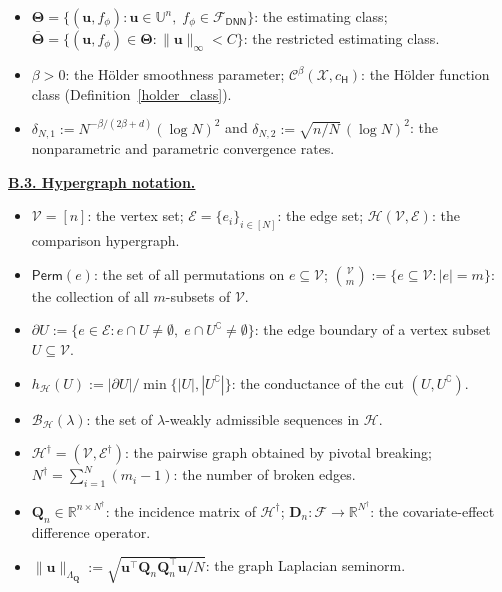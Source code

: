 \documentclass[
  12pt]{article}
\begin{document}
\begin{itemize}
    \item $\boldsymbol{\Theta} = \{(\boldsymbol{u}, f_\phi) : \boldsymbol{u} \in \mathbb{U}^n,\; f_\phi \in \mathcal{F}_{\mathsf{DNN}}\}$: the estimating class; $\bar{\boldsymbol{\Theta}} = \{(\boldsymbol{u}, f_\phi) \in \boldsymbol{\Theta} : \|\boldsymbol{u}\|_\infty < C\}$: the restricted estimating class.
    \item $\beta > 0$: the H\"older smoothness parameter; {$\mathcal{C}^\beta(\mathcal{X}, c_{\mathsf{H}})$}: the H\"older function class (Definition~\ref{holder_class}).
    \item $\delta_{N,1} := N^{-\beta/(2\beta+d)}(\log N)^2$ and $\delta_{N,2} := \sqrt{n/N}\,(\log N)^2$: the nonparametric and parametric convergence rates.
\end{itemize}
\underline{\textbf{B.3. Hypergraph notation.}}
\begin{itemize}
    \item $\mathcal{V} = [n]$: the vertex set; $\mathcal{E} = \{e_i\}_{i \in [N]}$: the edge set; $\mathcal{H}(\mathcal{V}, \mathcal{E})$: the comparison hypergraph.
    \item $\mathsf{Perm}(e)$: the set of all permutations on $e \subseteq \mathcal{V}$; $\binom{\mathcal{V}}{m} := \{e \subseteq \mathcal{V} : |e| = m\}$: the collection of all $m$-subsets of $\mathcal{V}$.
    \item $\partial U := \{e \in \mathcal{E} : e \cap U \neq \emptyset,\; e \cap U^\complement \neq \emptyset\}$: the edge boundary of a vertex subset $U \subseteq \mathcal{V}$.
    \item $h_{\mathcal{H}}(U) := |\partial U| / \min\{|U|, |U^\complement|\}$: the conductance of the cut $(U, U^\complement)$.
    \item $\mathcal{B}_{\mathcal{H}}(\lambda)$: the set of $\lambda$-weakly admissible sequences in $\mathcal{H}$.
    \item $\mathcal{H}^\dagger = (\mathcal{V}, \mathcal{E}^\dagger)$: the pairwise graph obtained by pivotal breaking; $N^\dagger = \sum_{i=1}^N (m_i - 1)$: the number of broken edges.
    \item $\boldsymbol{Q}_n \in \mathbb{R}^{n \times N^\dagger}$: the incidence matrix of $\mathcal{H}^\dagger$; $\boldsymbol{D}_n : \mathcal{F} \to \mathbb{R}^{N^\dagger}$: the covariate-effect difference operator.
    \item $\|\boldsymbol{u}\|_{\Lambda_{\boldsymbol{Q}}} := \sqrt{\boldsymbol{u}^\top \boldsymbol{Q}_n \boldsymbol{Q}_n^\top \boldsymbol{u} / N}$: the graph Laplacian seminorm.

\end{itemize}
\end{document}
